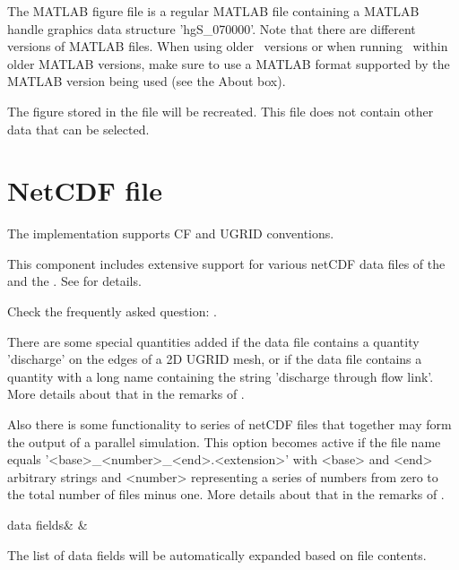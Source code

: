 The MATLAB figure file is a regular MATLAB file containing a MATLAB handle graphics data structure 'hgS\_070000'.
Note that there are different versions of MATLAB files.
When using older \QUICKPLOT\ versions or when running \QUICKPLOT\ within older MATLAB versions, make sure to use a MATLAB format supported by the MATLAB version being used (see the About box).

The figure stored in the file will be recreated.
This file does not contain other data that can be selected.




\section{NetCDF file} \label{Sec:FileNC}

\begin{Remark}
\item The implementation supports CF and UGRID conventions.
\item This component includes extensive support for various netCDF data files of the \dfmsuite and the \dhydrosuite.
See  for details.
\item Check the frequently asked question: .
\item There are some special quantities added if the data file contains a quantity 'discharge' on the edges of a 2D UGRID mesh, or if the data file contains a quantity with a long name containing the string 'discharge through flow link'.
More details about that in the remarks of .
\item Also there is some functionality to series of netCDF files that together may form the output of a parallel simulation.
This option becomes active if the file name equals '<base>\_\allowbreak<number>\_<end>.<extension>' with <base> and <end> arbitrary strings and <number> representing a series of numbers from zero to the total number of files minus one.
More details about that in the remarks of .
\end{Remark}

\begin{QUL-table}
\STRUT
data fields\ENi & \ENi & \ENi
\end{QUL-table}

\begin{enumerate_brackets}
\item The list of data fields will be automatically expanded based on file contents.
\end{enumerate_brackets}


